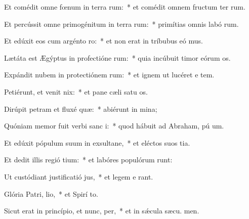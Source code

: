\item Et comédit omne fœnum in terra rum:~* et comédit omnem fructum ter rum.
\item Et percússit omne primogénitum in terra rum:~* primítias omnis labó rum.
\item Et edúxit eos cum argénto  ro:~* et non erat in tríbubus eó mus.
\item Lætáta est Ægýptus in profectióne rum:~* quia incúbuit timor eórum  os.
\item Expándit nubem in protectiónem rum:~* et ignem ut lucéret e  tem.
\item Petiérunt, et venit nix:~* et pane cæli satu os.
\item Dirúpit petram et fluxé quæ:~* abiérunt in  mina;
\item Quóniam memor fuit verbi sanc i:~* quod hábuit ad Abraham, pú um.
\item Et edúxit pópulum suum in exsultane,~* et eléctos suos  tia.
\item Et dedit illis regió tium:~* et labóres populórum runt:
\item Ut custódiant justificatió jus,~* et legem e rant.
\item Glória Patri,  lio,~* et Spirí to.
\item Sicut erat in princípio, et nunc,  per,~* et in sǽcula sæcu. men.
